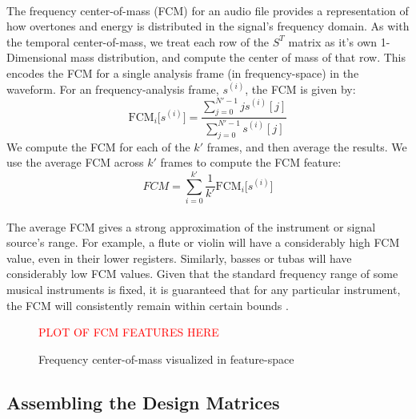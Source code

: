 \documentclass[12pt,letterpaper]{article}
\begin{document}
\paragraph*{}The frequency center-of-mass (FCM) for an audio file provides a representation of how overtones and energy is distributed in the signal's frequency domain. As with the temporal center-of-mass, we treat each row of the $S^T$ matrix as it's own 1-Dimensional mass distribution, and compute the center of mass of that row. This encodes the FCM for a single analysis frame (in frequency-space) in the waveform. For an frequency-analysis frame, $s^{(i)}$, the FCM is given by:
\begin{equation}
\label{eqn-FeatureFCM}
\text{FCM}_{i}\big[ s^{(i)} \big] = \frac{\sum_{j=0}^{N'-1}j s^{(i)}[j]}{\sum_{j=0}^{N'-1}s^{(i)}[j]}
\end{equation}
We compute the FCM for each of the $k'$ frames, and then average the results. We use the average FCM across $k'$ frames to compute the FCM feature:
\begin{equation}
FCM = \sum_{i=0}^{k'} \frac{1}{k'}\text{FCM}_{i}\big[ s^{(i)} \big]
\end{equation}

\paragraph*{}The average FCM gives a strong approximation of the instrument or signal source's range. For example, a flute or violin will have a considerably high FCM value, even in their lower registers. Similarly, basses or tubas will have considerably low FCM values. Given that the standard frequency range of some musical instruments is fixed, it is guaranteed that for any particular instrument, the FCM will consistently remain within certain bounds \cite{Olson,White}.

\begin{figure}[H]
\label{fig-FeatureFCM}
\begin{center}
\textcolor{red}{PLOT OF FCM FEATURES HERE}
\end{center}
\caption{Frequency center-of-mass visualized in feature-space}
\end{figure}


\subsection{Assembling the Design Matrices}
\label{subsec-AssembleXs}
\end{document}

